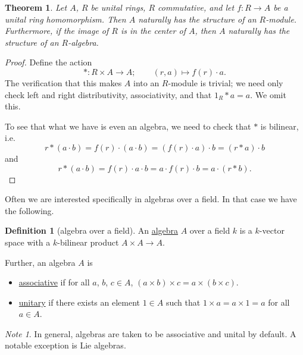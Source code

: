 \documentclass[a4paper,10pt]{scrreprt}
\newcommand{\defn}[1]{\ul{#1}}
\theoremstyle{definition}
\newtheorem{definition}{Definition}[section]
\theoremstyle{plain}
\newtheorem{theorem}{Theorem}[section]
\theoremstyle{remark}
\newtheorem{note}{Note}[section]
\begin{document}
\begin{theorem}
  \label{thm:ringhomomorphisminducesalgebra}
  Let $A$, $R$ be unital rings, $R$ commutative, and let $f\colon R \to A$ be a unital ring homomorphism. Then $A$ naturally has the structure of an $R$-module. Furthermore, if the image of $R$ is in the center of $A$, then $A$ naturally has the structure of an $R$-algebra.
\end{theorem}
\begin{proof}
  Define the action
  \begin{equation*}
    *\colon R \times A \to A;\qquad (r,a) \mapsto f(r)\cdot a.
  \end{equation*}
  The verification that this makes $A$ into an $R$-module is trivial; we need only check left and right distributivity, associativity, and that $1_{R}*a = a$. We omit this.

  To see that what we have is even an algebra, we need to check that $*$ is bilinear, i.e.
  \begin{equation*}
    r*(a\cdot b) = f(r)\cdot (a\cdot b) = (f(r)\cdot a)\cdot b = (r*a)\cdot b
  \end{equation*}
  and
  \begin{equation*}
    r*(a\cdot b) = f(r)\cdot a \cdot b = a \cdot f(r) \cdot b = a\cdot (r*b).
  \end{equation*}
\end{proof}

Often we are interested specifically in algebras over a field. In that case we have the following.
\begin{definition}[algebra over a field]
  \label{def:algebraoverafield}
  An \defn{algebra} $A$ over a field $k$ is a $k$-vector space with a $k$-bilinear product $A \times A \to A$.

  Further, an algebra $A$ is
  \begin{itemize}
    \item \defn{associative} if for all $a$, $b$, $c \in A$, $(a \times b) \times c = a \times (b \times c)$.

    \item \defn{unitary} if there exists an element $1 \in A$ such that $1 \times a = a \times 1 = a$ for all $a \in A$.
  \end{itemize}
\end{definition}

\begin{note}
  In general, algebras are taken to be associative and unital by default. A notable exception is Lie algebras.
\end{note}
\end{document}

